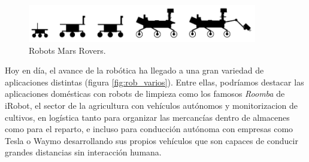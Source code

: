 \begin{figure} [H]
  \begin{center}
    \includegraphics[width=10cm]{figs/c1/rovers.png}
  \end{center}
  \caption[Robots Mars Rovers]{Robots Mars Rovers.}
  \label{fig:rovers_mars}
\end{figure}

Hoy en día, el avance de la robótica ha llegado a una gran variedad de aplicaciones distintas (figura \ref{fig:rob_varios}). Entre ellas, podríamos destacar las aplicaciones domésticas
con robots de limpieza como los famosos \textit{Roomba} de iRobot, el sector de la agricultura con vehículos autónomos y monitorizacion de cultivos,
en logística tanto para organizar las mercancías dentro de almacenes como para el reparto, e incluso para conducción autónoma con empresas como Tesla o
Waymo desarrollando sus propios vehículos que son capaces de conducir grandes distancias sin interacción humana.

